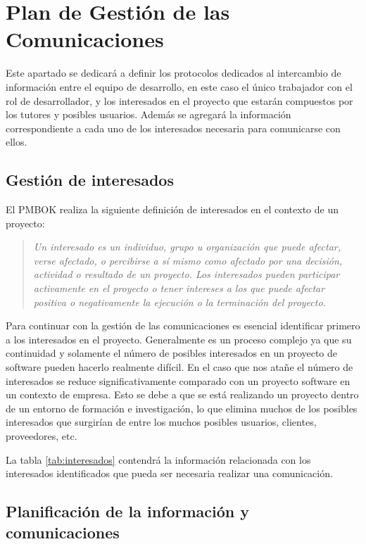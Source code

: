 \clearpage

\section{Plan de Gestión de las Comunicaciones}

Este apartado se dedicará a definir los protocolos dedicados al intercambio de información entre el equipo de desarrollo, en este caso el único trabajador con el rol de desarrollador, y los interesados en el proyecto que estarán compuestos por los tutores y posibles usuarios. Además se agregará la información correspondiente a cada uno de los interesados necesaria para comunicarse con ellos.

\subsection{Gestión de interesados}

El PMBOK\cite{pmbok} realiza la siguiente definición de interesados en el contexto de un proyecto:

\begin{quote}
\textit{
	Un interesado es un individuo, grupo u organización que puede afectar, verse afectado, o percibirse a sí mismo como afectado por una decisión, actividad o resultado de un proyecto. Los interesados pueden participar activamente en el proyecto o tener intereses a los que puede afectar positiva o negativamente la ejecución o la terminación del proyecto. 
}
\end{quote}

Para continuar con la gestión de las comunicaciones es esencial identificar primero a los interesados en el proyecto. Generalmente es un proceso complejo ya que su continuidad y solamente el número de posibles interesados en un proyecto de software pueden hacerlo realmente difícil. En el caso que nos atañe el número de interesados se reduce significativamente comparado con un proyecto software en un contexto de empresa. Esto se debe a que se está realizando un proyecto dentro de un entorno de formación e investigación, lo que elimina muchos de los posibles interesados que surgirían de entre los muchos posibles usuarios, clientes, proveedores, etc.

\bigskip

La tabla \ref{tab:interesados} contendrá la información relacionada con los interesados identificados que pueda ser necesaria realizar una comunicación.

\subsection{Planificación de la información y comunicaciones}

